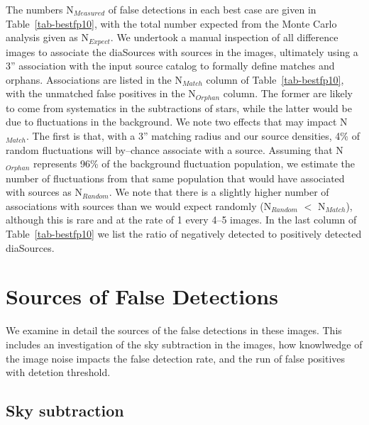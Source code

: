 \documentclass[floatfix, apj]{emulateapj}
\begin{document}
The numbers N$_{Measured}$ of false detections in each best case are given in Table~\ref{tab-bestfp10}, with the total number expected from the Monte Carlo analysis given as N$_{Expect}$.
We undertook a manual inspection of all difference images to associate the diaSources with sources in the images, ultimately using a 3'' association with the input source catalog to formally define matches and orphans.
Associations are listed in the N$_{Match}$ column of Table~\ref{tab-bestfp10}, with the unmatched false positives in the N$_{Orphan}$ column.
The former are likely to come from systematics in the subtractions of stars, while the latter would be due to fluctuations in the background.
We note two effects that may impact N$_{Match}$.
The first is that, with a 3'' matching radius and our source densities, 4\% of random fluctuations will by--chance associate with a source.
Assuming that N$_{Orphan}$ represents 96\% of the background fluctuation population, we estimate the number of fluctuations from that same population that would have associated with sources as N$_{Random}$.
We note that there is a slightly higher number of associations with sources than we would expect randomly (N$_{Random}$ $<$ N$_{Match}$), although this is rare and at the rate of 1 every 4--5 images.
In the last column of Table~\ref{tab-bestfp10} we list the ratio of negatively detected to positively detected diaSources.

\section{Sources of False Detections}
We examine in detail the sources of the false detections in these images.
This includes an investigation of the sky subtraction in the images, how knowlwedge of the image noise impacts the false detection rate, and the run of false positives with detetion threshold.

\subsection{Sky subtraction}
\end{document}
